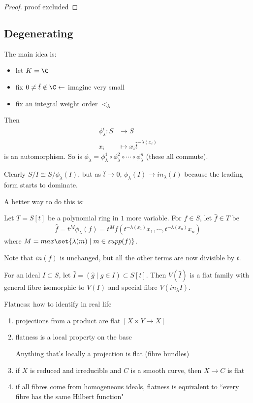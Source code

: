 \begin{proof}
proof excluded
\end{proof}

\subsection{Degenerating}

The main idea is:
\begin{itemize}
    \item let $K = \C$
    \item fix $0 \neq\hat{t} \notin \C \leftarrow$ imagine very small
    \item fix an integral weight order $<_\lambda$
\end{itemize}

Then
\begin{align*}
    \phi_\lambda^i : S &\to S\\
    x_i &\mapsto x_i \hat{t}^{- \lambda (x_i)}
\end{align*}
is an automorphism. So is $\phi_\lambda = \phi_\lambda^1 \circ \phi_\lambda^2 \circ \cdots \circ \phi_\lambda^n$ (these all commute).

Clearly $S/I \cong S / \phi_\lambda (I)$, but as $\hat{t} \to 0$, $\phi_\lambda (I) \to in_\lambda(I)$ because the leading form starts to dominate.

A better way to do this is:

Let $T = S[ t]$ be a polynomial ring in $1$ more variable. For $f \in S$, let $\hat{f} \in T$ be
\begin{align*}
    \hat{f} = t^M \phi_\lambda (f) = t^M f(t^{-\lambda (x_1)} x_1, \cdots,t^{-\lambda (x_n)} x_n)
\end{align*}
where $M = max \set{ \lambda(m) \mid m \in supp(f) }$.

Note that $in(f)$ is unchanged, but all the other terms are now divisible by $t$.

For an ideal $I \subset S$, let $\hat{I} = (\hat{g} \mid g \in I) \subset S[t]$. Then $V(\hat{I}) $ is a flat family with general fibre isomorphic to $V(I)$ and special fibre $V(in_\lambda I)$.

Flatness: how to identify in real life
\begin{enumerate}
    \item projections from a product are flat $[X \times Y \to X]$
    \item flatness is a local property on the base
    \begin{corollary}
    Anything that's locally a projection is flat (fibre bundles)
    \end{corollary}
    \item if $X$ is reduced and irreducible and $C$ is a smooth curve, then $X \to C$ is flat
    \item if all fibres come from homogeneous ideals, flatness is equivalent to ``every fibre has the same Hilbert function"
\end{enumerate}


